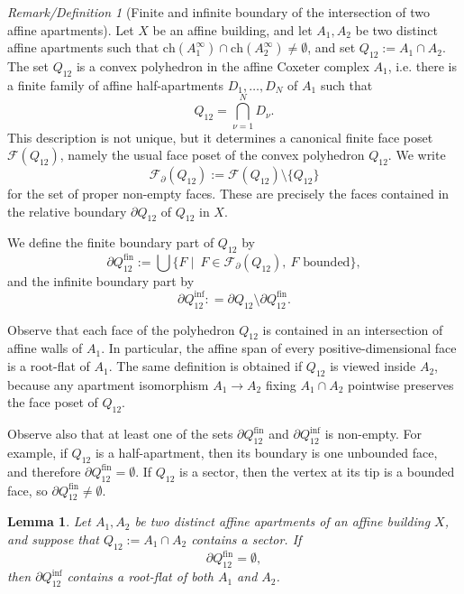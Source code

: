 \documentclass[11pt]{amsart}
\newcommand{\Ch}{\mathrm{ch}}
\theoremstyle{plain}
\newtheorem{lem}[thm]{Lemma}
\theoremstyle{definition}
\theoremstyle{remark}
\newtheorem{remdef}[thm]{Remark/Definition}
\begin{document}
	
	\begin{remdef}[Finite and infinite boundary of the intersection of two affine apartments]
			\label{rem::bounded_cone_affine_flats}
			Let \(X\) be an affine building, and let \(A_1,A_2\) be two distinct affine apartments such that $\Ch(A_1^\infty)\cap \Ch(A_2^\infty)\neq \emptyset$, and set $Q_{12}:=A_1\cap A_2$. The set \(Q_{12}\) is a convex polyhedron in the affine Coxeter complex \(A_1\), i.e. there is a finite family of affine half-apartments \(D_1,\ldots,D_N\) of \(A_1\) such that
			\[
			Q_{12}=\bigcap_{\nu=1}^N D_\nu .
			\]
			This description is not unique, but it determines a canonical finite face poset \(\mathscr F(Q_{12})\), namely the usual face poset of the convex polyhedron \(Q_{12}\). We write
			\[
			\mathscr F_\partial(Q_{12})
			:=
			\mathscr F(Q_{12})\setminus\{Q_{12}\}
			\]
			for the set of proper non-empty faces. These are precisely the faces contained in the relative boundary \(\partial Q_{12}\) of \(Q_{12}\) in $X$. 
			
			We define the finite boundary part of \(Q_{12}\) by
			\[
			\partial Q_{12}^{\mathrm{fin}}
			:=
			\bigcup \{F \mid \ F\in \mathscr F_\partial(Q_{12}), \
			F \text{ bounded}\},
			\]
			and the infinite boundary part by
			\[
			\partial Q_{12}^{\mathrm{inf}}: = \partial Q_{12}\setminus \partial Q_{12}^{\mathrm{fin}}.
			\]
		\end{remdef}
		
		
		Observe that each face of the polyhedron \(Q_{12}\) is contained in an intersection of affine walls of \(A_1\). In particular, the affine span of every positive-dimensional face is a root-flat of \(A_1\). The same definition is obtained if \(Q_{12}\) is viewed inside \(A_2\), because any apartment isomorphism \(A_1\to A_2\) fixing \(A_1\cap A_2\) pointwise preserves the face poset of \(Q_{12}\).
		
		Observe also that at least one of the sets \(\partial Q_{12}^{\mathrm{fin}}\) and \(\partial Q_{12}^{\mathrm{inf}}\) is non-empty. For example, if \(Q_{12}\) is a half-apartment, then its boundary is one unbounded face, and therefore \(\partial Q_{12}^{\mathrm{fin}}=\emptyset\). If \(Q_{12}\) is a sector, then the vertex at its tip is a bounded face, so \(\partial Q_{12}^{\mathrm{fin}}\neq\emptyset\).
	
	
	\begin{lem}
			\label{lem::affine_flat}
			Let \(A_1,A_2\) be two distinct affine apartments of an affine building \(X\), and suppose that
			\(Q_{12}:=A_1\cap A_2\) contains a sector. If
			\[
			\partial Q_{12}^{\mathrm{fin}}=\emptyset,
			\]
			then \(\partial Q_{12}^{\mathrm{inf}}\) contains a root-flat of both \(A_1\)  and \(A_2\).
		\end{lem}
		
\end{document}
